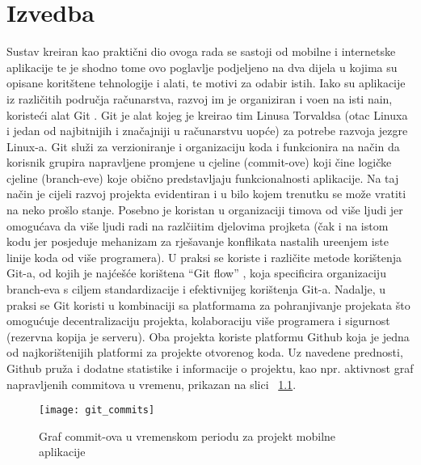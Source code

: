 \chapter{Izvedba}

Sustav kreiran kao prakti\v{c}ni dio ovoga rada se sastoji od mobilne i internetske aplikacije te je shodno tome ovo poglavlje podjeljeno na dva dijela u kojima su opisane korit\v{s}tene tehnologije i alati, te motivi za odabir istih. Iako su aplikacije iz razli\v{c}itih podru\v{c}ja ra\v{c}unarstva, razvoj im je organiziran i vo\dj en na isti nain, koriste\'{c}i alat Git \cite{git}. Git je alat kojeg je kreirao tim Linusa Torvaldsa (otac Linuxa i jedan od najbitnijih i zna\v{c}ajniji u ra\v{c}unarstvu uop\'{c}e) za potrebe razvoja jezgre Linux-a. Git slu\v{z}i za verzioniranje i organizaciju koda i funkcionira na na\v{c}in da korisnik grupira napravljene promjene u cjeline (commit-ove) koji \v{c}ine logi\v{c}ke cjeline (branch-eve) koje obi\v{c}no predstavljaju funkcionalnosti aplikacije. Na taj na\v{c}in je cijeli razvoj projekta evidentiran i u bilo kojem trenutku se mo\v{z}e vratiti na neko pro\v{s}lo stanje. Posebno je koristan u organizaciji timova od vi\v{s}e ljudi jer omogu\'{c}ava da vi\v{s}e ljudi radi na razl\v{c}iitim djelovima projketa (\v{c}ak i na istom kodu jer posjeduje mehanizam za rje\v{s}avanje konflikata nastalih ure\dj enjem iste linije koda od vi\v{s}e programera). U praksi se koriste i razli\v{c}ite metode kori\v{s}tenja Git-a, od kojih je naj\'{c}e\v{s}\'{c}e kori\v{s}tena ``Git flow'' \cite{git_flow}, koja specificira organizaciju branch-eva s ciljem standardizacije i efektivnijeg kori\v{s}tenja Git-a. Nadalje, u praksi se Git koristi u kombinaciji sa platformama za pohranjivanje projekata \v{s}to omogu\'{c}uje decentralizaciju projekta, kolaboraciju vi\v{s}e programera i sigurnost (rezervna kopija je serveru). Oba projekta koriste platformu Github \cite{github} koja je jedna od najkori\v{s}tenijih platformi za projekte otvorenog koda. Uz navedene prednosti, Github pru\v{z}a i dodatne statistike i informacije o projektu, kao npr. aktivnost graf napravljenih commitova u vremenu, prikazan na slici  ~\ref{fig:commits}.

\begin{figure}[!htbp]
	\begin{center}
 \texttt{[image: git\_commits]}
 \caption{Graf commit-ova u vremenskom periodu za projekt mobilne aplikacije}
 \label{fig:commits}
	\end{center}
\end{figure}

